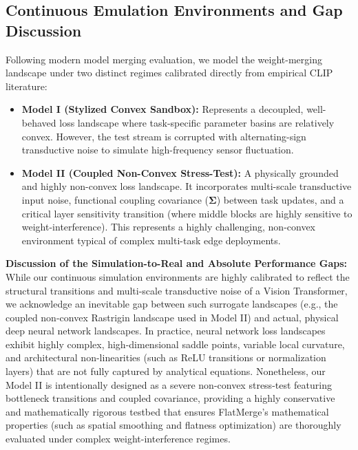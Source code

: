 \subsection{Continuous Emulation Environments and Gap Discussion}
Following modern model merging evaluation, we model the weight-merging landscape under two distinct regimes calibrated directly from empirical CLIP literature:
\begin{itemize}
    \item \textbf{Model I (Stylized Convex Sandbox):} Represents a decoupled, well-behaved loss landscape where task-specific parameter basins are relatively convex. However, the test stream is corrupted with alternating-sign transductive noise to simulate high-frequency sensor fluctuation.
    \item \textbf{Model II (Coupled Non-Convex Stress-Test):} A physically grounded and highly non-convex loss landscape. It incorporates multi-scale transductive input noise, functional coupling covariance ($\boldsymbol{\Sigma}$) between task updates, and a critical layer sensitivity transition (where middle blocks are highly sensitive to weight-interference). This represents a highly challenging, non-convex environment typical of complex multi-task edge deployments.
\end{itemize}

\textbf{Discussion of the Simulation-to-Real and Absolute Performance Gaps:}
While our continuous simulation environments are highly calibrated to reflect the structural transitions and multi-scale transductive noise of a Vision Transformer, we acknowledge an inevitable gap between such surrogate landscapes (e.g., the coupled non-convex Rastrigin landscape used in Model II) and actual, physical deep neural network landscapes. 
In practice, neural network loss landscapes exhibit highly complex, high-dimensional saddle points, variable local curvature, and architectural non-linearities (such as ReLU transitions or normalization layers) that are not fully captured by analytical equations. 
Nonetheless, our Model II is intentionally designed as a severe non-convex stress-test featuring bottleneck transitions and coupled covariance, providing a highly conservative and mathematically rigorous testbed that ensures FlatMerge's mathematical properties (such as spatial smoothing and flatness optimization) are thoroughly evaluated under complex weight-interference regimes.

